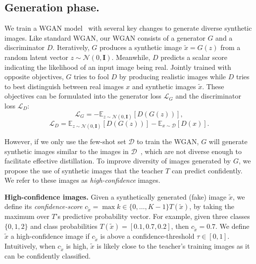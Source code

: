 \subsection{Generation phase.}
\begin{foldable}
  We train a WGAN model~\cite{gulrajani2017improved} with several key changes to generate diverse synthetic images.
  Like standard WGAN, our WGAN consists of a generator $G$ and a discriminator $D$.
  Iteratively, $G$ produces a synthetic image $\tilde{x} = G(z)$ from a random latent vector $z \sim \mathcal{N}(0, \mathbf{I})$.
  Meanwhile, $D$ predicts a scalar score indicating the likelihood of an input image being real.
  Jointly trained with opposite objectives, $G$ tries to fool $D$ by producing realistic images while $D$ tries to best distinguish between real images $x$ and synthetic images $\tilde{x}$.
  These objectives can be formulated into the generator loss $\mathcal{L}_G$ and the discriminator loss $\mathcal{L}_{D}$:
  \begin{equation}
    \mathcal{L}_G = -\mathbb{E}_{z \sim \mathcal{N}(0, \mathbf{I})} [D(G(z))],\label{eq:loss-G-wgan}
  \end{equation}
  \begin{equation}
    \mathcal{L}_{D} = \mathbb{E}_{z \sim \mathcal{N}(0, \mathbf{I})} [D(G(z))] - \mathbb{E}_{x \sim \mathcal{D}}[D(x)].\label{eq:loss-D-wgan}
  \end{equation}
\end{foldable}

\begin{foldable}
  However, if we only use the few-shot set $\mathcal{D}$ to train the WGAN, $G$ will generate synthetic images similar to the images in $\mathcal{D}$~\cite{karras2020training,yang2021data}, which are not diverse enough to facilitate effective distillation.
  To improve diversity of images generated by $G$, we propose the use of synthetic images that the teacher $T$ can predict confidently.
  We refer to these images as \textit{high-confidence} images.
\end{foldable}

\begin{foldable}
  \textbf{High-confidence images.}
  Given a synthetically generated (fake) image $\tilde{x}$, we define its \textit{confidence-score} $c_{\tilde{x}} = \max{k \in \{0, \ldots, K-1\}}T(\tilde{x})$, by taking the maximum over $T$'s predictive probability vector.
  For example, given three classes $\{0, 1, 2\}$ and class probabilities $T(\tilde{x})=[0.1, 0.7, 0.2]$, then $c_{\tilde{x}}=0.7$.
  We define $\tilde{x}$ a high-confidence image if $c_{\tilde{x}}$ is above a confidence-threshold $\tau\in[0,1]$.
  Intuitively, when $c_{\tilde{x}}$ is high, $\tilde{x}$ is likely close to the teacher's training images as it can be confidently classified.
\end{foldable}

